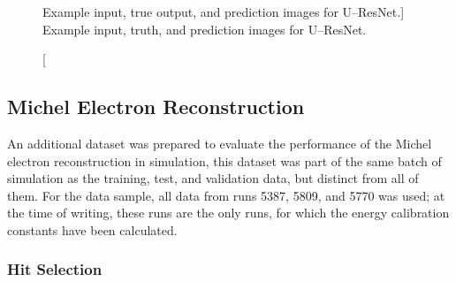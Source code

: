 \begin{figure}
	\caption
	[Example input, true output, and prediction images for U--ResNet.]
	{Example input, truth, and prediction images for U--ResNet.}
	\label{fig:unet_example}
\end{figure}

\subsection{Michel Electron Reconstruction}

An additional dataset was prepared to evaluate the performance of the Michel
electron reconstruction in simulation, this dataset was part of the same batch 
of simulation as the training, test, and validation data, but distinct from 
all of them. For the \protodune{} data sample, all data from runs 5387, 5809, 
and 5770 was used; at the time of writing, these runs are the only runs, for 
which the energy calibration constants have been calculated.

\subsubsection{Hit Selection}

